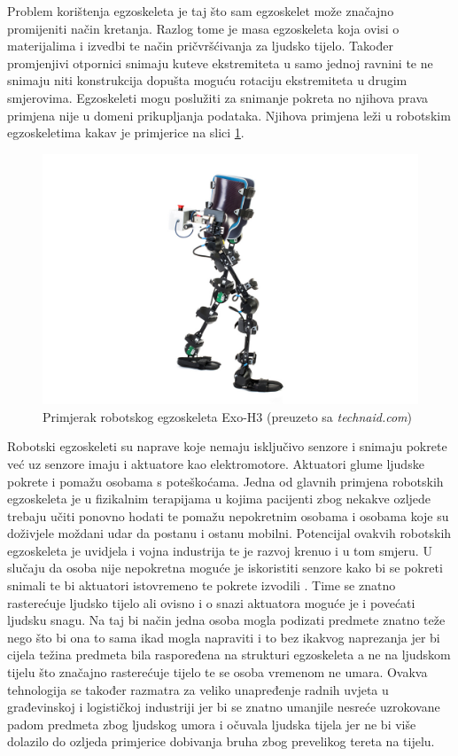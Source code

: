 \documentclass[times, utf8, diplomski]{fer}
\begin{document}
Problem korištenja egzoskeleta je taj što sam egzoskelet može značajno promijeniti način kretanja. Razlog tome je masa egzoskeleta
koja ovisi o materijalima i izvedbi te način pričvršćivanja za ljudsko tijelo. Također promjenjivi otpornici snimaju kuteve 
ekstremiteta u samo jednoj ravnini te ne snimaju niti konstrukcija dopušta moguću rotaciju ekstremiteta u drugim smjerovima.
Egzoskeleti mogu poslužiti za snimanje pokreta no njihova prava primjena nije u domeni prikupljanja podataka. Njihova primjena 
leži u robotskim egzoskeletima kakav je primjerice na slici \ref{exoskeleton}.

\begin{figure}
    \includegraphics[width=\textwidth]{exoskeleton.jpg}
    \caption{Primjerak robotskog egzoskeleta Exo-H3 (preuzeto sa \textit{technaid.com})}
    \label{exoskeleton}
\end{figure}

Robotski egzoskeleti su naprave koje nemaju isključivo senzore i snimaju pokrete već uz senzore imaju i aktuatore kao elektromotore.
Aktuatori glume ljudske pokrete i pomažu osobama s poteškoćama. Jedna od glavnih primjena robotskih egzoskeleta je u fizikalnim
terapijama u kojima pacijenti zbog nekakve ozljede trebaju učiti ponovno hodati te pomažu nepokretnim osobama i osobama koje su
doživjele moždani udar da postanu i ostanu mobilni. Potencijal ovakvih robotskih egzoskeleta je uvidjela i vojna industrija te
je razvoj krenuo i u tom smjeru. U slučaju da osoba nije nepokretna moguće je iskoristiti senzore kako bi se pokreti snimali te
bi aktuatori istovremeno te pokrete izvodili \citep{exo}. Time se znatno rasterećuje ljudsko tijelo ali ovisno i o snazi aktuatora moguće je i
povećati ljudsku snagu. Na taj bi način jedna osoba mogla podizati predmete znatno teže nego što bi ona to sama ikad mogla
napraviti i to bez ikakvog naprezanja jer bi cijela težina predmeta bila raspoređena na strukturi egzoskeleta a ne na ljudskom 
tijelu što značajno rasterećuje tijelo te se osoba vremenom ne umara. Ovakva tehnologija se također razmatra za veliko unapređenje
radnih uvjeta u građevinskoj i logističkoj industriji jer bi se znatno umanjile nesreće uzrokovane padom predmeta zbog ljudskog
umora i očuvala ljudska tijela jer ne bi više dolazilo do ozljeda primjerice dobivanja bruha zbog prevelikog tereta na tijelu.
\end{document}
